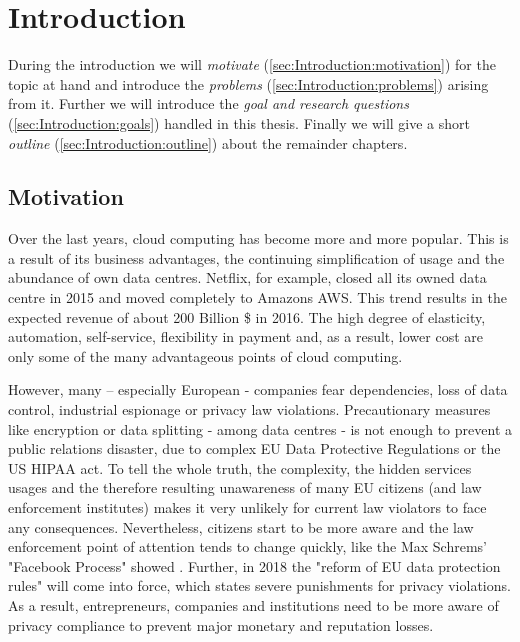 
\chapter{Introduction}
\label{ch:Introduction}

During the introduction we will \textit{motivate} (\autoref{sec:Introduction:motivation}) for the topic at hand and introduce the \textit{problems} (\autoref{sec:Introduction:problems}) arising from it. Further we will introduce the \textit{goal and research questions} (\autoref{sec:Introduction:goals}) handled in this thesis. Finally we will give a short \textit{outline} (\autoref{sec:Introduction:outline}) about the remainder chapters.


\section{Motivation}
\label{sec:Introduction:motivation}

Over the last years, cloud computing has become more and more popular. This is a result of its business advantages, the continuing simplification of usage and the abundance of own data centres. Netflix, for example, closed all its owned data centre in 2015 and moved completely to Amazons AWS\cite{DavidChernicoff.2015}. This trend results in the expected revenue of about 200 Billion \$ in 2016\cite{statista.com.2016}. The high degree of elasticity, automation, self-service, flexibility in payment and, as a result, lower cost are only some of the many advantageous points of cloud computing.\cite{Binz.2014}

However, many – especially European - companies fear dependencies, loss of data control, industrial espionage or privacy law violations. Precautionary measures like encryption or data splitting - among data centres - is not enough to prevent a public relations disaster, due to complex EU Data Protective Regulations\cite{personaldata.2011} or the US HIPAA act\cite{OfficeforCivilRights.20130726}. To tell the whole truth, the complexity, the hidden services usages and the therefore resulting unawareness of many EU citizens (and law enforcement institutes) makes it very unlikely for current law violators to face any consequences. Nevertheless, citizens start to be more aware and the law enforcement point of attention tends to change quickly, like the Max Schrems' "Facebook Process" showed \cite{JuliaBahr.20150923}. Further, in 2018 the "reform of EU data protection rules" will come into force, which states severe punishments for privacy violations\cite{personaldata.2011}. As a result, entrepreneurs, companies and institutions need to be more aware of privacy compliance to prevent major monetary and reputation losses. 

